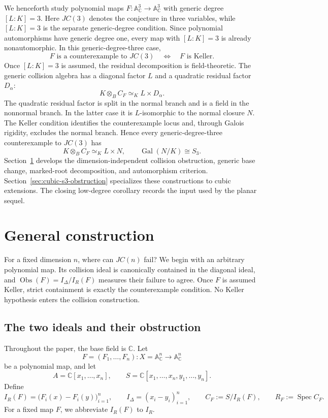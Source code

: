 \documentclass[11pt]{article}
\theoremstyle{remark}
\DeclareMathOperator{\Spec}{Spec}
\DeclareMathOperator{\Gal}{Gal}
\newcommand{\A}{\mathbb A}
\newcommand{\C}{\mathbb C}
\newcommand{\Obs}{\operatorname{Obs}}
\begin{document}
We henceforth study polynomial maps
\(F\colon\A^3_{\C}\to\A^3_{\C}\) with generic degree \([L:K]=3\).
Here \(JC(3)\) denotes the conjecture in three variables, while
\([L:K]=3\) is the separate generic-degree condition.  Since polynomial
automorphisms have generic degree one, every map with \([L:K]=3\) is already
nonautomorphic.  In this generic-degree-three case,
\[
  F\text{ is a counterexample to }JC(3)
  \quad\Longleftrightarrow\quad
  F\text{ is Keller}.
\]
Once \([L:K]=3\) is assumed, the residual decomposition is field-theoretic.
The generic collision algebra has a diagonal factor \(L\) and a quadratic
residual factor \(D_\alpha\):
\[
  K\otimes_BC_F\simeq_K L\times D_\alpha.
\]
The quadratic residual factor is split in the normal branch and is a field
in the nonnormal branch.  In the latter case it is \(L\)-isomorphic to the
normal closure \(N\).  The Keller condition identifies the counterexample
locus and, through Galois rigidity, excludes the normal branch.  Hence every
generic-degree-three counterexample to \(JC(3)\) has
\[
  K\otimes_BC_F\simeq_K L\times N,
  \qquad
  \Gal(N/K)\cong S_3.
\]
Section~\ref{sec:general-construction} develops the dimension-independent
collision obstruction, generic base change, marked-root decomposition, and
automorphism criterion.  Section~\ref{sec:cubic-s3-obstruction} specializes
these constructions to cubic extensions.  The closing low-degree corollary
records the input used by the planar sequel.

\section{General construction}
\label{sec:general-construction}

For a fixed dimension \(n\), where can \(JC(n)\) fail?  We begin with an
arbitrary polynomial map.  Its collision ideal is canonically contained in
the diagonal ideal, and \(\Obs(F)=I_\Delta/I_R(F)\) measures their failure to
agree.  Once \(F\) is assumed Keller, strict containment is exactly the
counterexample condition.  No Keller hypothesis enters the collision
construction.

\subsection{The two ideals and their obstruction}
\label{sec:collision-ideals}

Throughout the paper, the base field is \(\C\).  Let
\[
  F=(F_1,\dots,F_n)\colon
  X=\A^n_{\C}\longrightarrow\A^n_{\C}
\]
be a polynomial map, and let
\[
  A=\C[x_1,\dots,x_n],
  \qquad
  S=\C[x_1,\dots,x_n,y_1,\dots,y_n].
\]
Define
\[
  I_R(F)=\bigl(F_i(x)-F_i(y)\bigr)_{i=1}^{n},
  \qquad
  I_\Delta=(x_i-y_i)_{i=1}^{n},
  \qquad
  C_F:=S/I_R(F),
  \qquad
  R_F:=\Spec C_F.
\]
For a fixed map \(F\), we abbreviate \(I_R(F)\) to \(I_R\).
\end{document}
